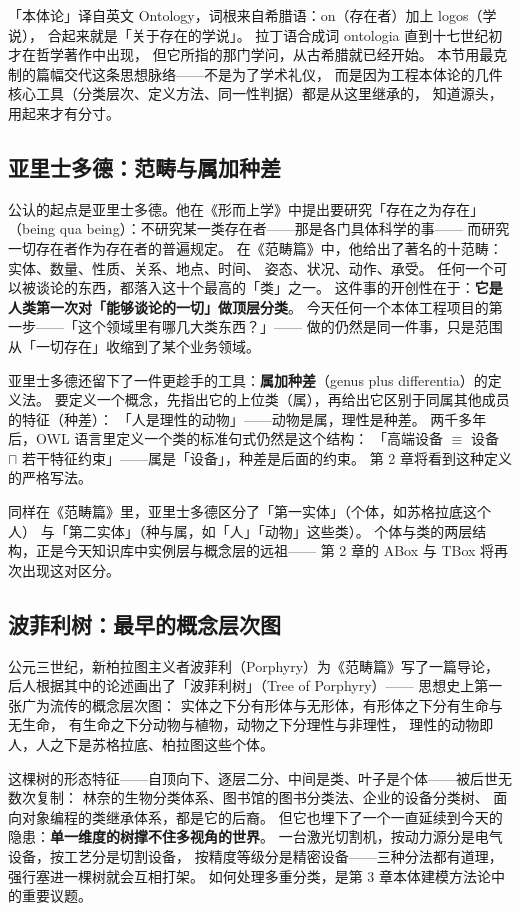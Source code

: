 「本体论」译自英文 Ontology，词根来自希腊语：on（存在者）加上 logos（学说），
合起来就是「关于存在的学说」。
拉丁语合成词 ontologia 直到十七世纪初才在哲学著作中出现，
但它所指的那门学问，从古希腊就已经开始。
本节用最克制的篇幅交代这条思想脉络——不是为了学术礼仪，
而是因为工程本体论的几件核心工具（分类层次、定义方法、同一性判据）都是从这里继承的，
知道源头，用起来才有分寸。

\subsection{亚里士多德：范畴与属加种差}

公认的起点是亚里士多德。他在《形而上学》中提出要研究「存在之为存在」
（being qua being）：不研究某一类存在者——那是各门具体科学的事——
而研究一切存在者作为存在者的普遍规定。
在《范畴篇》中，他给出了著名的十范畴：实体、数量、性质、关系、地点、时间、
姿态、状况、动作、承受。
任何一个可以被谈论的东西，都落入这十个最高的「类」之一。
这件事的开创性在于：\textbf{它是人类第一次对「能够谈论的一切」做顶层分类}。
今天任何一个本体工程项目的第一步——「这个领域里有哪几大类东西？」——
做的仍然是同一件事，只是范围从「一切存在」收缩到了某个业务领域。

亚里士多德还留下了一件更趁手的工具：\textbf{属加种差}（genus plus differentia）的定义法。
要定义一个概念，先指出它的上位类（属），再给出它区别于同属其他成员的特征（种差）：
「人是理性的动物」——动物是属，理性是种差。
两千多年后，OWL 语言里定义一个类的标准句式仍然是这个结构：
「高端设备 \(\equiv\) 设备 \(\sqcap\) 若干特征约束」——属是「设备」，种差是后面的约束。
第 2 章将看到这种定义的严格写法。

同样在《范畴篇》里，亚里士多德区分了「第一实体」（个体，如苏格拉底这个人）
与「第二实体」（种与属，如「人」「动物」这些类）。
个体与类的两层结构，正是今天知识库中实例层与概念层的远祖——
第 2 章的 ABox 与 TBox 将再次出现这对区分。

\subsection{波菲利树：最早的概念层次图}

公元三世纪，新柏拉图主义者波菲利（Porphyry）为《范畴篇》写了一篇导论，
后人根据其中的论述画出了「波菲利树」（Tree of Porphyry）——
思想史上第一张广为流传的概念层次图：
实体之下分有形体与无形体，有形体之下分有生命与无生命，
有生命之下分动物与植物，动物之下分理性与非理性，
理性的动物即人，人之下是苏格拉底、柏拉图这些个体。

这棵树的形态特征——自顶向下、逐层二分、中间是类、叶子是个体——被后世无数次复制：
林奈的生物分类体系、图书馆的图书分类法、企业的设备分类树、
面向对象编程的类继承体系，都是它的后裔。
但它也埋下了一个一直延续到今天的隐患：\textbf{单一维度的树撑不住多视角的世界}。
一台激光切割机，按动力源分是电气设备，按工艺分是切割设备，
按精度等级分是精密设备——三种分法都有道理，强行塞进一棵树就会互相打架。
如何处理多重分类，是第 3 章本体建模方法论中的重要议题。

